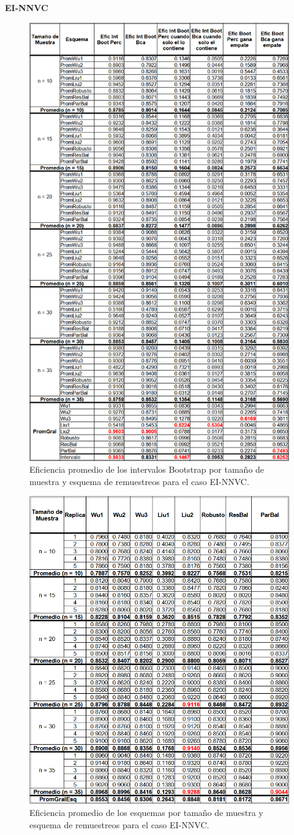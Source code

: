 \textbf{EI-NNVC}\\

\begin{figure}[ht] 
	\centering 
	\includegraphics[width=0.55\linewidth]{img/EI_NNVC_Efic_Boots.png} 
	\caption{Eficiencia promedio de los intervalos Bootstrap por tamaño de muestra y esquema de remuestreos para el caso EI-NNVC.} 
	\label{fig:EficPromIntBootsTamMuestEsqRemuEI-NNVC}
\end{figure}
\FloatBarrier



\begin{figure}[ht] 
	\centering 
	\includegraphics[width=0.70\linewidth]{img/EI_NNVC_Efic_Esq.png} 
	\caption{Eficiencia promedio de los esquemas por tamaño de muestra y esquema de remuestreos para el caso EI-NNVC.} 
	\label{fig:EficPromEsqTamMuesEsqRemuEI-NNVC}
\end{figure}
\FloatBarrier



